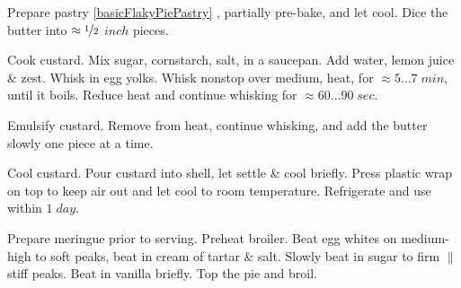 \begin{preparation}
\item Prepare pastry \ref{basicFlakyPiePastry} , partially pre-bake, and let cool. Dice the butter into $\approx\nicefrac{1}{2}$ $inch$ pieces.

\item Cook custard. Mix sugar, cornstarch, salt, in a saucepan. Add water, lemon juice \& zest. Whisk in egg yolks. Whisk nonstop over medium, heat, for $\approx 5\dots7\; min$, until it boils. Reduce heat and continue whisking for $\approx 60 \dots 90\; sec$.

\item Emulsify custard. Remove from heat, continue whisking, and add the butter slowly one piece at a time.

\item Cool custard. Pour custard into shell, let settle \& cool briefly. Press plastic wrap on top to keep air out and let cool to room temperature. Refrigerate and use within $1\; day$.

\item Prepare meringue prior to serving. Preheat broiler. Beat egg whites on medium-high to soft peaks, beat in cream of tartar \& salt. Slowly beat in sugar to firm $\|$ stiff peaks. Beat in vanilla briefly. Top the pie and broil.
\end{preparation}

\recipeend

